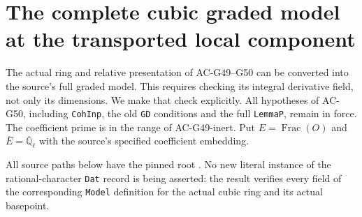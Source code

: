 \section{The complete cubic graded model at the transported local component}
\label{sec:cubic-full-model}

The actual ring and relative presentation of AC-G49--G50
can be converted into the source's full graded model.
This requires checking its integral derivative field, not
only its dimensions.  We make that check explicitly.
All hypotheses of AC-G50, including \texttt{CohInp}, the
old \texttt{GD} conditions and the full \texttt{LemmaP},
remain in force.  The coefficient prime is in the range
of AC-G49-inert.  Put $E=\operatorname{Frac}(O)$ and
$\overline E=\overline{\mathbb Q}_\ell$ with the source's
specified coefficient embedding.

All source paths below have the pinned root
.
No new literal instance of the rational-character
\texttt{Dat} record is being asserted: the result verifies
every field of the corresponding \texttt{Model} definition
for the actual cubic ring and its actual basepoint.

